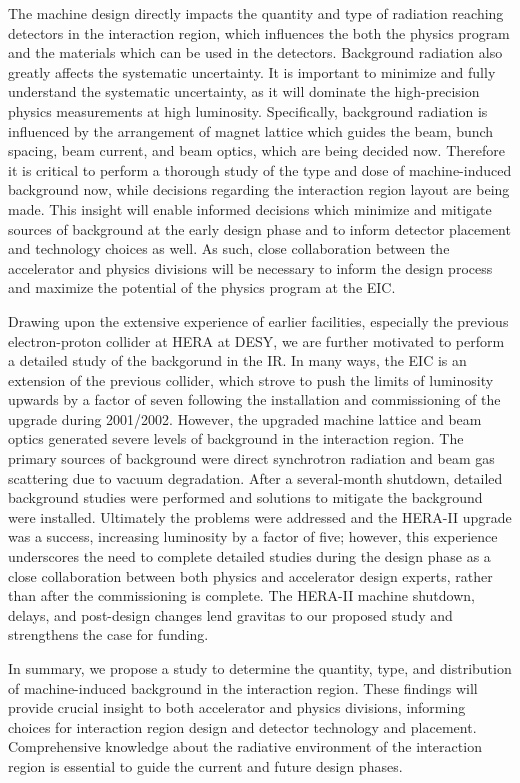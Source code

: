 
The machine design directly impacts the quantity and type of radiation reaching detectors in the interaction region, which influences the both the physics program and the materials which can be used in the detectors.  Background radiation also greatly affects the systematic uncertainty.  It is important to minimize and fully understand the systematic uncertainty, as it will dominate the high-precision physics measurements at high luminosity.  Specifically, background radiation is influenced by the arrangement of magnet lattice which guides the beam, bunch spacing, beam current, and beam optics, which are being decided now.  Therefore it is critical to perform a thorough study of the type and dose of machine-induced background now, while decisions regarding the interaction region layout are being made.  This insight will enable informed decisions which minimize and mitigate sources of background at the early design phase and to inform detector placement and technology choices as well.  As such, close collaboration between the accelerator and physics divisions will be necessary to inform the design process and maximize the potential of the physics program at the EIC.

Drawing upon the extensive experience of earlier facilities, especially the previous electron-proton collider at HERA at DESY, we are further motivated to perform a detailed study of the backgorund in the IR.  In many ways, the EIC is an extension of the previous collider, which strove to push the limits of luminosity upwards by a factor of seven following the installation and commissioning of the upgrade during 2001/2002.  However, the upgraded machine lattice and beam optics generated severe levels of background in the interaction region.  The primary sources of background were direct synchrotron radiation and beam gas scattering due to vacuum degradation.  After a several-month shutdown, detailed background studies were performed and solutions to mitigate the background were installed.  Ultimately the problems were addressed and the HERA-II upgrade was a success, increasing luminosity by a factor of five; however, this experience underscores the need to complete detailed studies during the design phase as a close collaboration between both physics and accelerator design experts, rather than after the commissioning is complete.  The HERA-II machine shutdown, delays, and post-design changes lend gravitas to our proposed study and strengthens the case for funding.

In summary, we propose a study to determine the quantity, type, and distribution of machine-induced background in the interaction region.  These findings will provide crucial insight to both accelerator and physics divisions, informing choices for interaction region design and detector technology and placement.  Comprehensive knowledge about the radiative environment of the interaction region is essential to guide the current and future design phases.

